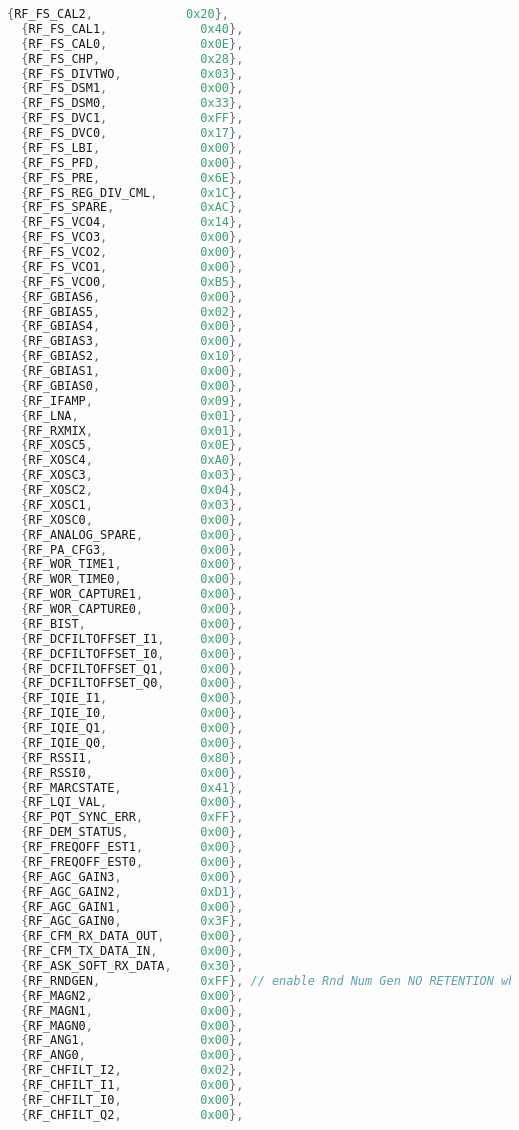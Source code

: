 \begin{lstlisting}[language=C,frame=b,captionpos=b,caption={Struktur mit Adresse-Wert Paaren für die Registerkonfiguration des CC1200 Funkchips},label=lst:cc1200register]
  {RF_FS_CAL2,             0x20},
  {RF_FS_CAL1,             0x40},
  {RF_FS_CAL0,             0x0E},
  {RF_FS_CHP,              0x28},
  {RF_FS_DIVTWO,           0x03},
  {RF_FS_DSM1,             0x00},
  {RF_FS_DSM0,             0x33},
  {RF_FS_DVC1,             0xFF},
  {RF_FS_DVC0,             0x17},
  {RF_FS_LBI,              0x00},
  {RF_FS_PFD,              0x00},
  {RF_FS_PRE,              0x6E},
  {RF_FS_REG_DIV_CML,      0x1C},
  {RF_FS_SPARE,            0xAC},
  {RF_FS_VCO4,             0x14},
  {RF_FS_VCO3,             0x00},
  {RF_FS_VCO2,             0x00},
  {RF_FS_VCO1,             0x00},
  {RF_FS_VCO0,             0xB5},
  {RF_GBIAS6,              0x00},
  {RF_GBIAS5,              0x02},
  {RF_GBIAS4,              0x00},
  {RF_GBIAS3,              0x00},
  {RF_GBIAS2,              0x10},
  {RF_GBIAS1,              0x00},
  {RF_GBIAS0,              0x00},
  {RF_IFAMP,               0x09},
  {RF_LNA,                 0x01},
  {RF_RXMIX,               0x01},
  {RF_XOSC5,               0x0E},
  {RF_XOSC4,               0xA0},
  {RF_XOSC3,               0x03},
  {RF_XOSC2,               0x04},
  {RF_XOSC1,               0x03},
  {RF_XOSC0,               0x00},
  {RF_ANALOG_SPARE,        0x00},
  {RF_PA_CFG3,             0x00},
  {RF_WOR_TIME1,           0x00},
  {RF_WOR_TIME0,           0x00},
  {RF_WOR_CAPTURE1,        0x00},
  {RF_WOR_CAPTURE0,        0x00},
  {RF_BIST,                0x00},
  {RF_DCFILTOFFSET_I1,     0x00},
  {RF_DCFILTOFFSET_I0,     0x00},
  {RF_DCFILTOFFSET_Q1,     0x00},
  {RF_DCFILTOFFSET_Q0,     0x00},
  {RF_IQIE_I1,             0x00},
  {RF_IQIE_I0,             0x00},
  {RF_IQIE_Q1,             0x00},
  {RF_IQIE_Q0,             0x00},
  {RF_RSSI1,               0x80},
  {RF_RSSI0,               0x00},
  {RF_MARCSTATE,           0x41},
  {RF_LQI_VAL,             0x00},
  {RF_PQT_SYNC_ERR,        0xFF},
  {RF_DEM_STATUS,          0x00},
  {RF_FREQOFF_EST1,        0x00},
  {RF_FREQOFF_EST0,        0x00},
  {RF_AGC_GAIN3,           0x00},
  {RF_AGC_GAIN2,           0xD1},
  {RF_AGC_GAIN1,           0x00},
  {RF_AGC_GAIN0,           0x3F},
  {RF_CFM_RX_DATA_OUT,     0x00},
  {RF_CFM_TX_DATA_IN,      0x00},
  {RF_ASK_SOFT_RX_DATA,    0x30},
  {RF_RNDGEN,              0xFF}, // enable Rnd Num Gen NO RETENTION when going to sleep !!!
  {RF_MAGN2,               0x00},
  {RF_MAGN1,               0x00},
  {RF_MAGN0,               0x00},
  {RF_ANG1,                0x00},
  {RF_ANG0,                0x00},
  {RF_CHFILT_I2,           0x02},
  {RF_CHFILT_I1,           0x00},
  {RF_CHFILT_I0,           0x00},
  {RF_CHFILT_Q2,           0x00},

\end{lstlisting}
